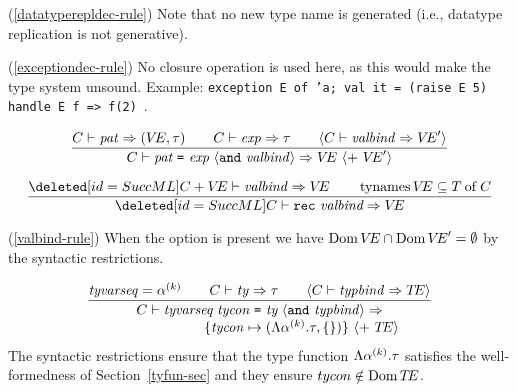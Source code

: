 \begin{description}
\item{(\ref{datatyperepldec-rule})}
Note that no new type name is generated (i.e., datatype replication is
not generative).

\item{\CUT{(\ref{abstypedec-rule})}}

\item{(\ref{exceptiondec-rule})}
No closure operation is used here, as this would make the type system unsound.
Example: {\tt exception E of 'a; val it = (raise E 5) handle E f => f(2)}~.
\end{description}%

%
\begin{equation}        %
\label{valbind-rule}
\frac{\C\ts\pat\ra(\VE,\tau)\qquad\C\ts\exp\ra\tau\qquad
      \langle\C\ts\valbind\ra\VE'\rangle }
     {\C\ts\longvalbind\ra\VE\ \langle +\ \VE'\rangle}\index{29.1}
\end{equation}

\begin{equation}        %
\label{recvalbind-rule}
\frac{\CUT{\C+\VE\ts\valbind\ra\VE\qquad\TyNamesFcn\VE\subseteq\of{\T}{\C}}}
     {\CUT{\C\ts\recvalbind\ra\VE}}
\end{equation}
\comments
\begin{description}
\item{(\ref{valbind-rule})}
When the option is present we have $\mathop{\rm Dom}\nolimits\mbox{$V\!E$}\cap
\mathop{\rm Dom}\nolimits\mbox{$V\!E$}' = \emptyset$ by the syntactic restrictions.
\oldpagebreak
\item{\CUT{(\ref{recvalbind-rule})}}
\end{description}

\begin{equation}        %
\frac{\tyvarseq=\alphak\qquad\C\ts\ty\ra\tau\qquad
      \langle\C\ts\typbind\ra\TE\rangle}
     {\begin{array}{c}
      \C\ts\longtypbind\ra\\
      \qquad\qquad\qquad
      \{\tycon\mapsto(\typefcnk,\emptymap)\}\ \langle +\ \TE\rangle
      \end{array}
     }\index{29.3}
\end{equation}
\comment The syntactic restrictions ensure that the type function
$\Lambda\mbox{$\alpha^{(k)}$}.\tau$ satisfies the well-formedness of 
Section~\ref{tyfun-sec} and they ensure $tycon\notin\mathop{\rm Dom}\nolimits\mbox{$T\!E$}$.


